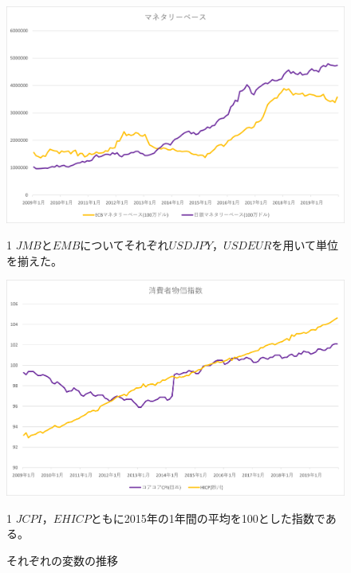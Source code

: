 \documentclass[12pt]{jarticle}
\begin{document}
{%
\begin{figure}[!htbp]
  \centering
  \caption{それぞれの変数の推移}
  \vspace{10pt}
  \includegraphics[width=16cm]{mbfix.png}
  \vspace{10pt}
  \begin{tablenotes}\footnotesize
    \item[1] $JMB$と$EMB$についてそれぞれ$USDJPY$，$USDEUR$を用いて単位を揃えた。
  \end{tablenotes}
  \vspace{10pt}
  \includegraphics[width=16cm]{cpi09.png}
  \vspace{10pt}
  \begin{tablenotes}\footnotesize
    \item[1] $JCPI$，$EHICP$ともに2015年の1年間の平均を100とした指数である。
  \end{tablenotes}
\end{figure}

}
\end{document}
